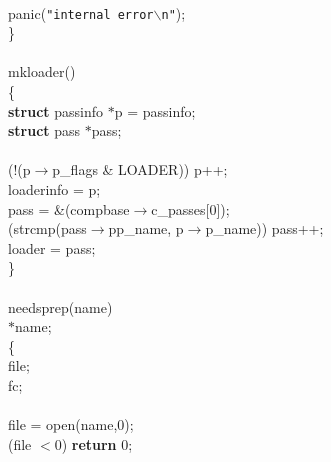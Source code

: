 \begin{flushleft}
\mbox{}\\
\hspace*{3\indentation}panic({\tt"internal error$\backslash$n"});\mbox{}\\
\}\mbox{}\\
\mbox{}\\
mkloader()\mbox{}\\
\{\mbox{}\\
\hspace*{3\indentation}{\bf register} {\bf struct} passinfo $\ast$p = passinfo;\mbox{}\\
\hspace*{3\indentation}{\bf register} {\bf struct} pass $\ast$pass;\mbox{}\\
\mbox{}\\
\hspace*{3\indentation}{\bf while} (!(p$\rightarrow$p\_flags \& LOADER)) p++;\mbox{}\\
\hspace*{3\indentation}loaderinfo = p;\mbox{}\\
\hspace*{3\indentation}pass = \&(compbase$\rightarrow$c\_passes[0]);\mbox{}\\
\hspace*{3\indentation}{\bf while} (strcmp(pass$\rightarrow$pp\_name, p$\rightarrow$p\_name)) pass++;\mbox{}\\
\hspace*{3\indentation}loader = pass;\mbox{}\\
\}\mbox{}\\
\mbox{}\\
needsprep(name)\mbox{}\\
\hspace*{3\indentation}{\bf char} $\ast$name;\mbox{}\\
\{\mbox{}\\
\hspace*{3\indentation}{\bf int} file;\mbox{}\\
\hspace*{3\indentation}{\bf char} fc;\mbox{}\\
\mbox{}\\
\hspace*{3\indentation}file = open(name,0);\mbox{}\\
\hspace*{3\indentation}{\bf if} (file $<$0) {\bf return} 0;\mbox{}\\

\end{flushleft}
